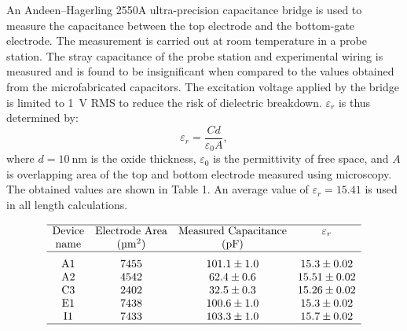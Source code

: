 An Andeen--Hagerling 2550A ultra-precision capacitance bridge is used to measure the capacitance between the top electrode and the bottom-gate electrode. The measurement is carried out at room temperature in a probe station. The stray capacitance of the probe station and experimental wiring is measured and is found to be insignificant when compared to the values obtained from the microfabricated capacitors. The excitation voltage applied by the bridge is limited to \SI{1}{\volt} RMS to reduce the risk of dielectric breakdown. $\varepsilon_r$ is thus determined by:
%
\begin{equation}
    \varepsilon_r = \frac{Cd}{\varepsilon_0 A},
\end{equation}
%
where $d = \SI{10}{\nano\metre}$ is the oxide thickness, $\varepsilon_0$ is the permittivity of free space, and $A$ is overlapping area of the top and bottom electrode measured using microscopy. The obtained values are shown in Table 1. An average value of $\varepsilon_r = 15.41$ is used in all length calculations.
%
\begin{table}
    \caption{\label{tab:measured_capacitance}
        Measured values of electrode area, capacitance and $\varepsilon_r$  for several capacitors. These are consistent across various randomly selected points onto a single chip. Errors for $\varepsilon_r$ were found to be at the third decimal place.}
    \[
        \begin{array}{cccc}
            \hline\textrm{Device} & \textrm{Electrode Area}     & \textrm{Measured Capacitance} & \varepsilon_r        \\
            \textrm{name}         & (\si{\micro\metre\squared}) & (\si{\pico\farad})            &                      \\
            \hline
            \textrm{A}1           & 7455                        & 101.1\pm1.0                   & 15.3\pm0.02  \Tsmall \\
            \textrm{A}2           & 4542                        & 62.4\pm0.6                    & 15.51\pm0.02         \\
            \textrm{C}3           & 2402                        & 32.5\pm0.3                    & 15.26\pm0.02         \\
            \textrm{E}1           & 7438                        & 100.6\pm1.0                   & 15.3\pm0.02          \\
            \textrm{I}1           & 7433                        & 103.3\pm1.0                   & 15.7\pm0.02          \\
            \hline
        \end{array}
    \]
\end{table}
